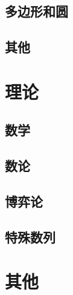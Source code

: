 \documentclass[12pt,a4paper,titlepage]{article}
\begin{document}
	\subsection{多边形和圆}

	\subsection{其他}

\section{\LARGE 理论}
	\subsection{数学}

	\subsection{数论}

	\subsection{博弈论}

    \subsection{特殊数列}

\section{\LARGE 其他}

\end{document}
